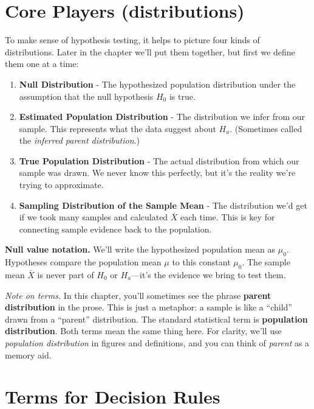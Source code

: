 \documentclass[
  letterpaper,
  DIV=11,
  numbers=noendperiod]{scrreprt}
\begin{document}
\section{Core Players (distributions)}\label{core-players-distributions}

To make sense of hypothesis testing, it helps to picture four kinds of
distributions. Later in the chapter we'll put them together, but first
we define them one at a time:

\begin{enumerate}
\def\labelenumi{\arabic{enumi}.}
\item
  \textbf{Null Distribution} - The hypothesized population distribution
  under the assumption that the null hypothesis \(H_0\) is true.
\item
  \textbf{Estimated Population Distribution} - The distribution we infer
  from our sample. This represents what the data suggest about \(H_a\).
  (Sometimes called the \emph{inferred parent distribution}.)
\item
  \textbf{True Population Distribution} - The actual distribution from
  which our sample was drawn. We never know this perfectly, but it's the
  reality we're trying to approximate.
\item
  \textbf{Sampling Distribution of the Sample Mean} - The distribution
  we'd get if we took many samples and calculated \(\bar{X}\) each time.
  This is key for connecting sample evidence back to the population.
\end{enumerate}

\textbf{Null value notation.} We'll write the hypothesized population
mean as \(\mu_0\). Hypotheses compare the population mean \(\mu\) to
this constant \(\mu_0\). The sample mean \(\bar{X}\) is never part of
\(H_0\) or \(H_a\)---it's the evidence we bring to test them.

\emph{Note on terms.} In this chapter, you'll sometimes see the phrase
\textbf{parent distribution} in the prose. This is just a metaphor: a
sample is like a ``child'' drawn from a ``parent'' distribution. The
standard statistical term is \textbf{population distribution}. Both
terms mean the same thing here. For clarity, we'll use \emph{population
distribution} in figures and definitions, and you can think of
\emph{parent} as a memory aid.

\section{Terms for Decision Rules}\label{terms-for-decision-rules}
\end{document}
